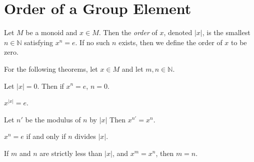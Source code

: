 \section{Order of a Group Element}

\begin{definition}
    \label{definition : order}
    \leanok
    Let $M$ be a monoid and $x \in M$. Then the \textit{order} of $x$, denoted $|x|$, is the smallest $n \in \mathbb{N}$ satisfying $x^n = e$. If no such $n$ exists, then we define the order of $x$ to be zero.
\end{definition}

For the following theorems, let $x \in M$ and let $m,n \in \mathbb{N}$.

\begin{theorem}
    \label{theorem : mpow_order_zero}
    \leanok
    Let $|x| = 0$. Then if $x^n = e$, $n = 0$.
\end{theorem}

\begin{theorem}
    \label{theorem : mpow_order}
    \leanok
    $x^{|x|} = e$.
\end{theorem}

\begin{theorem}
    \label{theorem : mpow_mod_order}
    \leanok
    Let $n'$ be the modulus of $n$ by $|x|$ Then $x^{n'} = x^n$.
\end{theorem}

\begin{theorem}
    \label{theorem : order_divides_iff_mpow_id}
    \leanok
    $x^n = e$ if and only if $n$ divides $|x|$.
\end{theorem}

\begin{lemma}
    \label{theorem : mpow_inj_of_lt_order}
    \leanok
    If $m$ and $n$ are strictly less than $|x|$, and $x^m = x^n$, then $m = n$.
\end{lemma}

